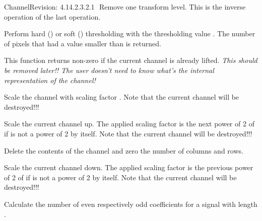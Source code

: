 \begin{manpage}{\libtitle}{Channel}{$ $Revision: 4.14.2.3.2.1 $ $}
    Remove one transform level. This is the inverse operation of the last
     operation.

    Perform hard () or soft () thresholding with
    the thresholding value . The number of pixels that had a
    value smaller than  is returned.

    This function returns non-zero if the current channel is already lifted.
    \emph{This should be removed later!! The user doesn't need to know what's
    the internal representation of the channel!}

    Scale the channel with scaling factor . Note that the current
    channel will be destroyed!!!


\subtitle{Protected \\ Operations}

    Scale the current channel up. The applied scaling factor is the next
    power of 2 of  if  is not a power of 2 by itself.
    Note that the current channel will be destroyed!!!


\subtitle{Virtual \\ Protected \\ Operations}

    Delete the contents of the channel and zero the number of columns and rows.

    Scale the current channel down. The applied scaling factor is the previous
    power of 2 of  if  is not a power of 2 by itself. Note
    that the current channel will be destroyed!!!


\subtitle{Static \\ Protected \\ Operations}

    Calculate the number of even respectively odd coefficients for a signal
    with length .


\end{manpage}
